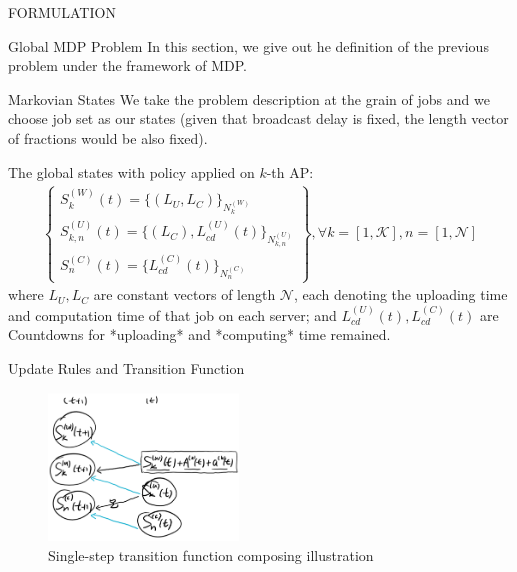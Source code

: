 \documentclass[10pt, conference, letterpaper]{IEEEtran}
\begin{document}
\begin{section}{FORMULATION}
        \begin{subsection}{Global MDP Problem}
            In this section, we give out he definition of the previous problem under the framework of MDP.

            \begin{subsubsection}{Markovian States}
                We take the problem description at the grain of jobs and we choose job set as our states (given that broadcast delay is fixed, the length vector of fractions would be also fixed).

                The global states with policy applied on $k$-th AP:
                \begin{gather*}
                    \begin{Bmatrix}
                        S_{k}^{(W)}(t) = \{ (L_U, L_C) \}_{N_{k}^{(W)}}
                        \\
                        S_{k,n}^{(U)}(t)= \{ (L_C), L_{cd}^{(U)}(t) \}_{N_{k,n}^{(U)}}
                        \\
                        S_{n}^{(C)}(t)  = \{ L_{cd}^{(C)}(t) \}_{N_{n}^{(C)}}
                    \end{Bmatrix},
                    \forall k=[1,\mathcal{K}], n=[1,\mathcal{N}]
                \end{gather*}
                where $L_U, L_C$ are constant vectors of length $\mathcal{N}$, each denoting the uploading time and computation time of that job on each server; and $L^{(U)}_{cd}(t), L^{(C)}_{cd}(t)$ are Countdowns for *uploading* and *computing* time remained.
            \end{subsubsection}

            \begin{subsubsection}{Update Rules and Transition Function}
                \begin{figure}[h]
                    \centering
                    \includegraphics[width=0.45\textwidth]{single-transition.png}
                    \caption{Single-step transition function composing illustration}
                    \label{fig:trans}
                \end{figure}


\end{subsubsection}
\end{subsection}
\end{section}
\end{document}
